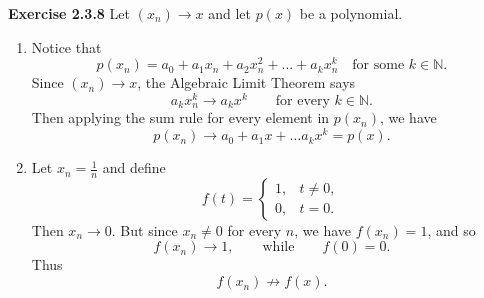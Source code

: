 \documentclass[12pt]{article}
\begin{document}
\textbf{Exercise 2.3.8}
Let \( (x_n) \to  x\) and let \( p(x) \) be a polynomial.
\begin{enumerate}[label=(\alph*)]
    \item Notice that
          \[
              p(x_n) = a_0 + a_1 x_n + a_2 x_n^2 + \dots + a_k x_n^k \quad \text{for some } k \in \mathbb{N}.
          \]
          Since \( (x_n) \to x \), the Algebraic Limit Theorem says
          \[
              a_k x_n^k \to a_k x^k \qquad \text{for every } k \in \mathbb{N}.
          \]
          Then applying the sum rule for every element in \( p(x_n) \), we have
          \[
              p(x_n) \to  a_0 + a_1 x + \dots a_k x^k = p(x).
          \]
    \item Let \( x_n = \frac{1}{n} \) and define
          \[
              f(t) = \begin{cases}
                  1, & t \neq 0 , \\
                  0, & t = 0.
              \end{cases}
          \]
          Then \( x_n \to 0 \). But since \( x_n \neq 0 \) for every \( n \), we have \( f(x_n) = 1 \), and so
          \[
              f(x_n) \to 1, \qquad \text{while} \qquad f(0) = 0.
          \]
          Thus
          \[
              f(x_n) \not \to f(x).
          \]
\end{enumerate}
\end{document}
